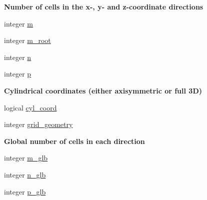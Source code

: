 \begin{Indent}\textbf{ Number of cells in the x-\/, y-\/ and z-\/coordinate directions}\par
\begin{DoxyCompactItemize}
\item 
integer \hyperlink{namespacem__global__parameters_aee38c9d03e9195858a93ec611b605f33}{m}
\item 
integer \hyperlink{namespacem__global__parameters_afabaedf16b26e327635e956d13b45086}{m\+\_\+root}
\item 
integer \hyperlink{namespacem__global__parameters_ac72422e5f77149bd32cf0cfd01a36544}{n}
\item 
integer \hyperlink{namespacem__global__parameters_ac040dbf547e6d5de8df08e864d8131e7}{p}
\end{DoxyCompactItemize}
\end{Indent}
\begin{Indent}\textbf{ Cylindrical coordinates (either axisymmetric or full 3D)}\par
\begin{DoxyCompactItemize}
\item 
logical \hyperlink{namespacem__global__parameters_a53f0d5eed7783c9760aaeeaa0abbd58c}{cyl\+\_\+coord}
\item 
integer \hyperlink{namespacem__global__parameters_a0f2d413d9739928f8e1a98f0a5783ab9}{grid\+\_\+geometry}
\end{DoxyCompactItemize}
\end{Indent}
\begin{Indent}\textbf{ Global number of cells in each direction}\par
\begin{DoxyCompactItemize}
\item 
integer \hyperlink{namespacem__global__parameters_ad4e160df8d0de7ea1801a1ca29f8e9b0}{m\+\_\+glb}
\item 
integer \hyperlink{namespacem__global__parameters_adab11dab474410541d4c37725bea01e1}{n\+\_\+glb}
\item 
integer \hyperlink{namespacem__global__parameters_a1072f221ca8e41b0ea3240b33374cc1e}{p\+\_\+glb}
\end{DoxyCompactItemize}
\end{Indent}
